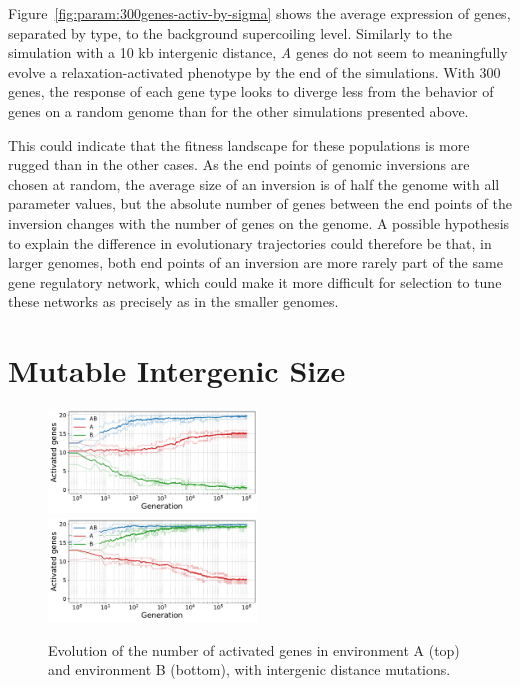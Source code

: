 Figure~\ref{fig:param:300genes-activ-by-sigma} shows the average expression of genes, separated by type, to the background supercoiling level.
Similarly to the simulation with a 10 kb intergenic distance, \emph{A} genes do not seem to meaningfully evolve a relaxation-activated phenotype by the end of the simulations.
With 300 genes, the response of each gene type looks to diverge less from the behavior of genes on a random genome than for the other simulations presented above.

This could indicate that the fitness landscape for these populations is more rugged than in the other cases.
As the end points of genomic inversions are chosen at random, the average size of an inversion is of half the genome with all parameter values, but the absolute number of genes between the end points of the inversion changes with the number of genes on the genome.
A possible hypothesis to explain the difference in evolutionary trajectories could therefore be that, in larger genomes, both end points of an inversion are more rarely part of the same gene regulatory network, which could make it more difficult for selection to tune these networks as precisely as in the smaller genomes.


\FloatBlock

\section{Mutable Intergenic Size}


\begin{figure}[H]
  \centering
  \includegraphics[width=0.495\textwidth]{param/evolve-intergene/gene_activity_env_A.pdf}
  \includegraphics[width=0.495\textwidth]{param/evolve-intergene/gene_activity_env_B.pdf}
  \caption[Evolution of the number of activated genes in each environment, with intergenic distance mutations]{Evolution of the number of activated genes in environment A (top) and environment B (bottom), with intergenic distance mutations.}
  \end{figure}


